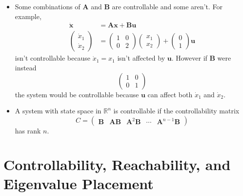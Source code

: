 \documentclass{article}
\renewcommand{\vec}[1]{\boldsymbol{\mathbf{#1}}}
\newcommand{\dvec}[1]{\dot{\vec{#1}}}
\begin{document}
\begin{itemize}
  \item Some combinations of $\vec{A}$ and $\vec{B}$ are controllable and some aren't. For example, \begin{align*}
          \dvec{x}        & = \vec{A} \vec{x} + \vec{B} \vec{u}                 \\
          \begin{pmatrix}
            \dot{x}_1 \\
            \dot{x}_2
          \end{pmatrix} & = \begin{pmatrix}
                              1 & 0 \\
                              0 & 2
                            \end{pmatrix} \begin{pmatrix}
                                            x_1 \\
                                            x_2
                                          \end{pmatrix} + \begin{pmatrix}
                                                            0 \\
                                                            1
                                                          \end{pmatrix} \vec{u}
        \end{align*} isn't controllable because $\dot{x}_1 = x_1$ isn't affected by $\vec{u}$. However if $\vec{B}$ were instead \[\begin{pmatrix}
            1 & 0 \\
            0 & 1
          \end{pmatrix}\] the system would be controllable because $\vec{u}$ can affect both $\dot{x}_1$ and $\dot{x}_2$.

  \item A system with state space in $\mathbb{R}^n$ is controllable if the controllability matrix \[C = \begin{pmatrix}
            \vec{B} & \vec{A} \vec{B} & \vec{A}^2 \vec{B} & \cdots & \vec{A}^{n - 1} \vec{B}
          \end{pmatrix}\] has rank $n$.
\end{itemize}

\section{Controllability, Reachability, and Eigenvalue Placement}
\end{document}
